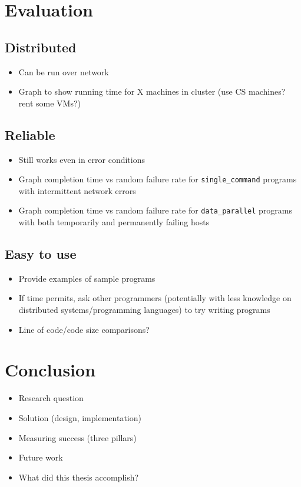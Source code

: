 \documentclass[twoside]{report}
\begin{document}
\chapter{Evaluation}

\section{Distributed}
\begin{itemize}
  \item Can be run over network
  \item Graph to show running time for X machines in cluster (use CS machines? rent some VMs?)
\end{itemize}

\section{Reliable}

\begin{itemize}
  \item Still works even in error conditions
  \item Graph completion time vs random failure rate for \texttt{single\_command} programs with intermittent network errors
  \item Graph completion time vs random failure rate for \texttt{data\_parallel} programs with both temporarily and permanently failing hosts
\end{itemize}

\section{Easy to use}

\begin{itemize}
  \item Provide examples of sample programs
  \item If time permits, ask other programmers (potentially with less knowledge on distributed systems/programming languages) to try writing programs
  \item Line of code/code size comparisons?
\end{itemize}

\chapter{Conclusion}
\begin{itemize}
  \item Research question
  \item Solution (design, implementation)
  \item Measuring success (three pillars)
  \item Future work
  \item What did this thesis accomplish?
\end{itemize}




\end{document}
